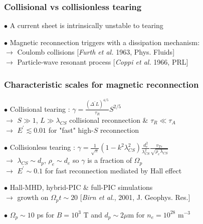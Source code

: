 \documentclass{beamer}
\begin{document}
\begin{frame}
\frametitle{Collisional vs collisionless tearing}

$\bullet$ A current sheet is intrinsically unstable to tearing

\begin{center}

\end{center}

$\bullet$ Magnetic reconnection triggers with a dissipation mechanism: \\[0.4cm]
$\to$ Coulomb collisions [\textit{Furth et al.} 1963, Phys. Fluids] \\
$\to$ Particle-wave resonant process [\textit{Coppi et al.} 1966, PRL]


\end{frame}



\begin{frame}
\frametitle{Characteristic scales for magnetic reconnection}

$\bullet$ Collisional tearing : $\displaystyle \gamma = \frac{(\Delta^{\prime} L)^{4/5}}{\tau_R} S^{2/5}$ \\

$\to$ $S \gg 1$, $L \gg \lambda_{CS}$ collisional reconnection \& $\tau_R \ll \tau_A$ \\
$\to$ $E^{\prime} \lesssim 0.01$ for "fast" high-$S$ reconnection \\

\bigskip

$\bullet$ Collisionless tearing : $\displaystyle \gamma = \frac{1}{\sqrt{\pi}} (1 - k^2\lambda_{CS}^2) \frac{d_e^2}{\lambda_{CS}^2} \frac{v_{Te}}{\sqrt{\rho_e \lambda_{CS}}} $ \\

$\to$ $\lambda_{CS} \sim d_p$, $\rho_e \sim d_e$ so $\gamma$ is a fraction of $\Omega_p$ \\
$\to$ $E^{\prime} \sim 0.1$ for fast reconnection mediated by Hall effect \\

\bigskip

$\bullet$ Hall-MHD, hybrid-PIC \& full-PIC simulations \\
$\to$ growth on $\Omega_p t \sim 20$ [\textit{Birn et al.}, 2001, J. Geophys. Res.] \\

\bigskip

$\bullet$ $\Omega_p \sim 10$ ps for $B = 10^3$ T and $d_p \sim 2 \mu$m for $n_e = 10^{28}$ m$^{-3}$ \\

\end{frame}
\end{document}
